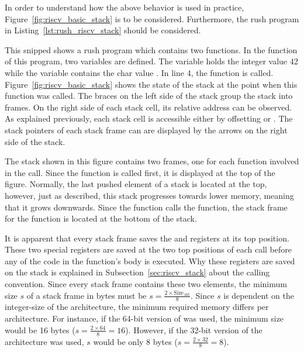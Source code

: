 In order to understand how the above behavior is used in practice, Figure~\ref{fig:riscv_basic_stack} is to be considered.
Furthermore, the rush program in Listing~\ref{lst:rush_riscv_stack} should be considered.


This snipped shows a rush program which contains two functions.
In the  function of this program, two variables are defined.
The  variable holds the integer value 42 while the  variable contains the char value .
In line 4, the  function is called.
Figure~\ref{fig:riscv_basic_stack} shows the state of the stack at the point when this function was called.
The braces on the left side of the stack group the stack into frames.
On the right side of each stack cell, its relative address can be observed.
As explained previously, each stack cell is accessible either by offsetting 
or . The stack pointers of each stack frame can are displayed by the arrows on the right side of the stack.

The stack shown in this figure contains two frames, one for each function involved in the call.
Since the  function is called first, it is displayed at the top of the figure.
Normally, the last pushed element of a stack is located at the top, however, just as described,
this stack progresses towards lower memory, meaning that it grows downwards.
Since the  function calls the  function, the stack frame for the  function is located at the bottom of the stack.

It is apparent that every stack frame saves the  and  registers at its top position.
These two special registers are saved at the two top positions of each call before any of the code in the function's body is executed.
Why these registers are saved on the stack is explained in Subsection~\ref{sec:riscv_stack} about the calling convention.
Since every stack frame contains these two elements,
the minimum size $s$ of a \riscv{} stack frame in bytes must be $s = \frac{2 \times \text{Size}\,_\text{int}}{8}$.
Since $s$ is dependent on the integer-size of the \riscv{} architecture, the minimum required memory differs per \riscv{} architecture.
For instance, if the 64-bit version of \riscv{} was used, the minimum size would be 16 bytes ($s = \frac{2 \times 64}{8} = 16$).
However, if the 32-bit version of the architecture was used, $s$ would be only 8 bytes ($s = \frac{2 \times 32}{8} = 8$).

